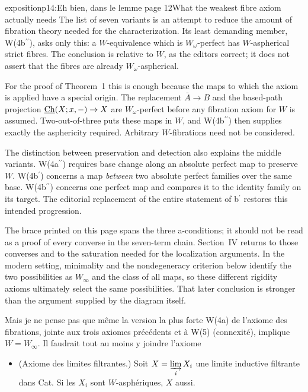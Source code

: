 \begin{dcomment}{exposition}{p14:Eh bien, dans le lemme page 12}{What the weakest fibre axiom actually needs}
The list of seven variants is an attempt to reduce the amount of fibration theory needed for the characterization. Its least demanding member, W(4b\(^{\prime\prime}\)), asks only this: a \(W\)-equivalence which is \(W_\omega\)-perfect has \(W\)-aspherical strict fibres. The conclusion is relative to \(W\), as the editors correct; it does not assert that the fibres are already \(W_\omega\)-aspherical.

For the proof of Theorem~1 this is enough because the maps to which the axiom is applied have a special origin. The replacement \(\bar A\to B\) and the based-path projection \(\underline{\mathrm{Ch}}(X;x,-)\to X\) are \(W_\omega\)-perfect before any fibration axiom for \(W\) is assumed. Two-out-of-three puts these maps in \(W\), and W(4b\(^{\prime\prime}\)) then supplies exactly the asphericity required. Arbitrary \(W\)-fibrations need not be considered.

The distinction between preservation and detection also explains the middle variants. W(4a\(^{\prime\prime}\)) requires base change along an absolute perfect map to preserve \(W\). W(4b\(^{\prime}\)) concerns a map \emph{between} two absolute perfect families over the same base. W(4b\(^{\prime\prime}\)) concerns one perfect map and compares it to the identity family on its target. The editorial replacement of the entire statement of b\(^{\prime}\) restores this intended progression.

The brace printed on this page spans the three a-conditions; it should not be read as a proof of every converse in the seven-term chain. Section~IV returns to those converses and to the saturation needed for the localization arguments. In the modern setting, minimality and the nondegeneracy criterion below identify the two possibilities as \(W_\infty\) and the class of all maps, so these different rigidity axioms ultimately select the same possibilities. That later conclusion is stronger than the argument supplied by the diagram itself.
\end{dcomment}


Mais je ne pense pas que même la version la plus forte W(4a) de l'axiome des fibrations, jointe aux trois axiomes précédents et à W(5) (connexité), implique $W = W_\infty$. Il faudrait tout au moins y joindre l'axiome

\begin{itemize}[leftmargin=4em, labelwidth=3em, labelsep=0.6em]
\item[\textbf{W(6)}] (Axiome des limites filtrantes.) Soit $X = \varinjlim\limits_{i} X_i$ une limite inductive filtrante dans Cat. Si les $X_i$ sont $W$-asphériques, $X$ aussi.
\end{itemize}


